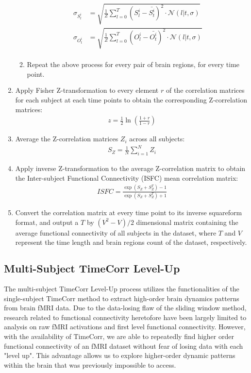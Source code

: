 \documentclass[11pt]{article}
\begin{document}
\begin{enumerate}
\begin{enumerate}
\begin{align*}
\sigma_{S_t^i} &=\sqrt{ \frac{1}{Z}\sum_{l=0}^T (S_l^i-\bar{S_t^i})^2 \cdot \mathcal{N}(l|t,\sigma)}\\
\sigma_{O_t^i} &=\sqrt{ \frac{1}{Z}\sum_{l=0}^T (O_l^i-\bar{O_t^i})^2 \cdot \mathcal{N}(l|t,\sigma)}\\
\end{align*}
\item Repeat the above process for every pair of brain regions, for every time point.
\end{enumerate}
\item Apply Fisher Z-transformation to every element $r$ of the correlation matrices for each subject at each time points to obtain the corresponding Z-correlation matrices:
\begin{align*}
z = \frac{1}{2}\ln(\frac{1+r}{1-r})
\end{align*}
\item Average the Z-correlation matrices $Z_i$ across all subjects:
\begin{align*}
S_Z = \frac{1}{N}\sum^N_{i=1}Z_i
\end{align*}
\item Apply inverse Z-transformation to the average Z-correlation matrix to obtain the Inter-subject Functional Connectivity (ISFC) mean correlation matrix:
\begin{align*}
ISFC = \frac{\exp(S_Z+S_Z^T)-1}{\exp(S_Z+S_Z^T)+1}
\end{align*}
\item Convert the correlation matrix at every time point to its inverse squareform format, and output a $T$ by $(V^2-V)/2$ dimensional matrix containing the average functional connectivity of all subjects in the dataset, where $T$ and $V$ represent the time length and brain regions count of the dataset, respectively.
\end{enumerate}

\subsection{Multi-Subject TimeCorr Level-Up}
The multi-subject TimeCorr Level-Up process utilizes the functionalities of the single-subject TimeCorr method to extract high-order brain dynamics patterns from brain fMRI data. Due to the data-losing flaw of the sliding window method, research related to functional connectivity heretofore have been largely limited to analysis on raw fMRI activations and first level functional connectivity. However, with the availability of TimeCorr, we are able to repeatedly find higher order functional connectivity of an fMRI dataset without fear of losing data with each "level up". This advantage allows us to explore higher-order dynamic patterns within the brain that was previously impossible to access.
\end{document}
